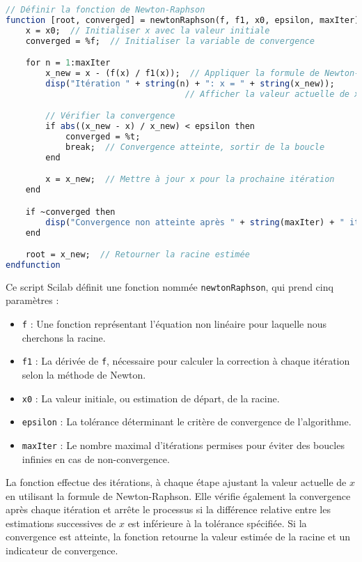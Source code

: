 \documentclass{article}
\begin{document}
\begin{lstlisting}[language=Scilab]
// Définir la fonction de Newton-Raphson
function [root, converged] = newtonRaphson(f, f1, x0, epsilon, maxIter)
    x = x0;  // Initialiser x avec la valeur initiale
    converged = %f;  // Initialiser la variable de convergence

    for n = 1:maxIter
        x_new = x - (f(x) / f1(x));  // Appliquer la formule de Newton-Raphson
        disp("Itération " + string(n) + ": x = " + string(x_new));
                                    // Afficher la valeur actuelle de x

        // Vérifier la convergence
        if abs((x_new - x) / x_new) < epsilon then
            converged = %t;
            break;  // Convergence atteinte, sortir de la boucle
        end

        x = x_new;  // Mettre à jour x pour la prochaine itération
    end

    if ~converged then
        disp("Convergence non atteinte après " + string(maxIter) + " itérations.");
    end

    root = x_new;  // Retourner la racine estimée
endfunction
\end{lstlisting}

Ce script Scilab définit une fonction nommée \texttt{newtonRaphson}, qui prend cinq paramètres :
\begin{itemize}
    \item \texttt{f} : Une fonction représentant l'équation non linéaire pour laquelle nous cherchons la racine.
    \item \texttt{f1} : La dérivée de \texttt{f}, nécessaire pour calculer la correction à chaque itération selon la méthode de Newton.
    \item \texttt{x0} : La valeur initiale, ou estimation de départ, de la racine.
    \item \texttt{epsilon} : La tolérance déterminant le critère de convergence de l'algorithme.
    \item \texttt{maxIter} : Le nombre maximal d'itérations permises pour éviter des boucles infinies en cas de non-convergence.
\end{itemize}

La fonction effectue des itérations, à chaque étape ajustant la valeur actuelle de \( x \) en utilisant la formule de Newton-Raphson. Elle vérifie également la convergence après chaque itération et arrête le processus si la différence relative entre les estimations successives de \( x \) est inférieure à la tolérance spécifiée. Si la convergence est atteinte, la fonction retourne la valeur estimée de la racine et un indicateur de convergence.
\end{document}
